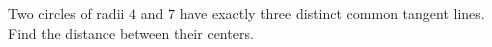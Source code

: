 Two circles of radii $4$ and $7$ have exactly three distinct common tangent lines. Find the distance between their centers.

